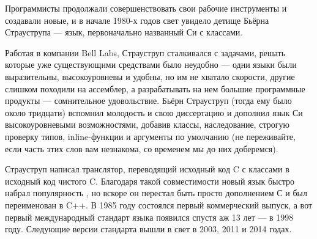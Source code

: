 \documentclass[book.tex]{subfiles}
\begin{document}

Программисты продолжали совершенствовать свои рабочие инструменты и создавали новые, и в начале 1980-х годов свет увидело детище Бьёрна Страуструпа --- язык, первоначально названный Си с классами. 

Работая в компании Bell Labs, Страуструп сталкивался с задачами, решать которые уже существующими средствами было неудобно --- одни языки были выразительны, высокоуровневы и удобны, но им не хватало скорости, другие слишком походили на ассемблер, а разрабатывать на нем большие программные продукты --- сомнительное удовольствие. Бьёрн Страуструп (тогда ему было около тридцати) вспомнил молодость и свою диссертацию и дополнил язык Си высокоуровневыми возможностями, добавив классы, наследование, строгую проверку типов, inline-функции и аргументы по умолчанию (не переживайте, если часть этих слов вам незнакома, со временем мы до них доберемся).

Страуструп написал транслятор, переводящий исходный код C с классами в исходный код чистого C. Благодаря такой совместимости новый язык быстро набрал популярность , но вскоре он перестал быть просто дополнением С и был переименован в C++. В 1985 году состоялся первый коммерческий выпуск, а вот первый международный стандарт языка появился спустя аж 13 лет --- в 1998 году. Следующие версии стандарта вышли в свет в 2003, 2011 и 2014 годах.
\end{document}
